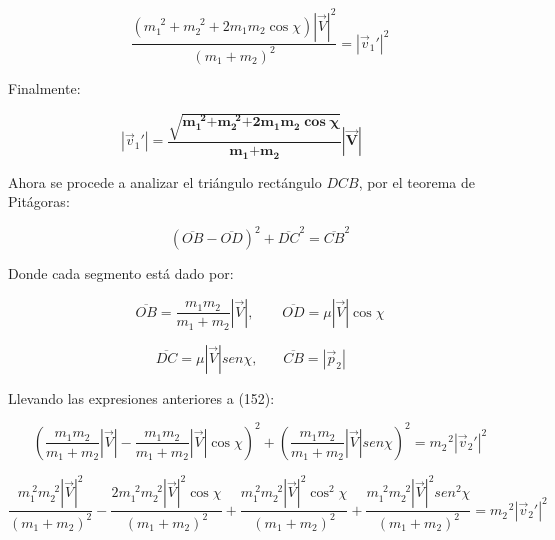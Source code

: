 \documentclass[]{article}
\begin{document}
\[\frac{\left( m_{1}^{\ \ 2} + m_{2}^{\ \ 2} + 2m_{1}m_{2}\cos\chi \right)\left| \overrightarrow{V} \right|^{2}}{\left( m_{1} + m_{2} \right)^{2}} = \left| {\overrightarrow{v}}_{1}' \right|^{2}\]

Finalmente:

\[\left| {\overrightarrow{v}}_{1}' \right|\mathbf{=}\frac{\sqrt{\mathbf{m}_{\mathbf{1}}^{\mathbf{\ \ 2}}\mathbf{+}\mathbf{m}_{\mathbf{2}}^{\mathbf{\ \ 2}}\mathbf{+ 2}\mathbf{m}_{\mathbf{1}}\mathbf{m}_{\mathbf{2}}\mathbf{\cos}\mathbf{\chi}}}{\mathbf{m}_{\mathbf{1}}\mathbf{+}\mathbf{m}_{\mathbf{2}}}\left| \overrightarrow{\mathbf{V}} \right|\mathbf{\ \ \ \ \ \ \ \ \ \ \ \ }\]

Ahora se procede a analizar el triángulo rectángulo \(DCB\), por el
teorema de Pitágoras:

\[\left( \overline{OB} - \overline{OD} \right)^{2} + {\overline{DC}}^{2} = {\overline{CB}}^{2}\]

Donde cada segmento está dado por:

\[\overline{OB} = \frac{m_{1}m_{2}}{m_{1} + m_{2}}\left| \overrightarrow{V} \right|,\ \ \ \ \ \ \ \ \ \overline{OD} = \mu\left| \overrightarrow{V} \right|\cos\chi\]

\[\ \ \ \ \ \ \ \ \ \ \ \ \ \ \ \ \ \ \ \ \ \ \ \ \ \ \ \ \ \ \ \ \ \ \ \ \ \ \ \ \ \overline{DC} = \mu\left| \overrightarrow{V} \right|{sen}\chi,\ \ \ \ \ \ \ \ \overline{CB} = \left| {\overrightarrow{p}}_{2} \right|\ \ \ \ \ \ \ \ \ \ \ \ \ \ \ \ \ \ \ \ \ \ \ \ \ \ \ \ \ \ \ \ \ \ \ \ \ \ \ \ \ \ \ \ \ \ \ \]

Llevando las expresiones anteriores a (152):

\[\left( \frac{m_{1}m_{2}}{m_{1} + m_{2}}\left| \overrightarrow{V} \right| - \frac{m_{1}m_{2}}{m_{1} + m_{2}}\left| \overrightarrow{V} \right|\cos\chi \right)^{2} + \left( \frac{m_{1}m_{2}}{m_{1} + m_{2}}\left| \overrightarrow{V} \right|{sen}\chi \right)^{2} = m_{2}^{\ \ \ 2}\left| {\overrightarrow{v}}_{2}' \right|^{2}\]

\[\frac{m_{1}^{\ 2}m_{2}^{\ \ 2}\left| \overrightarrow{V} \right|^{2}}{\left( m_{1} + m_{2} \right)^{2}} - \frac{2m_{1}^{\ \ 2}m_{2}^{\ \ 2}\left| \overrightarrow{V} \right|^{2}\cos\chi}{\left( m_{1} + m_{2} \right)^{2}} + \frac{m_{1}^{\ 2}{m_{2}^{\ \ 2}\left| \overrightarrow{V} \right|}^{2}\cos^{2}\chi}{\left( m_{1} + m_{2} \right)^{2}} + \frac{m_{1}^{\ \ 2}m_{2}^{\ \ 2}\left| \overrightarrow{V} \right|^{2}{sen}^{2}\chi}{\left( m_{1} + m_{2} \right)^{2}} = m_{2}^{\ \ \ 2}\left| {\overrightarrow{v}}_{2}' \right|^{2}\]
\end{document}
